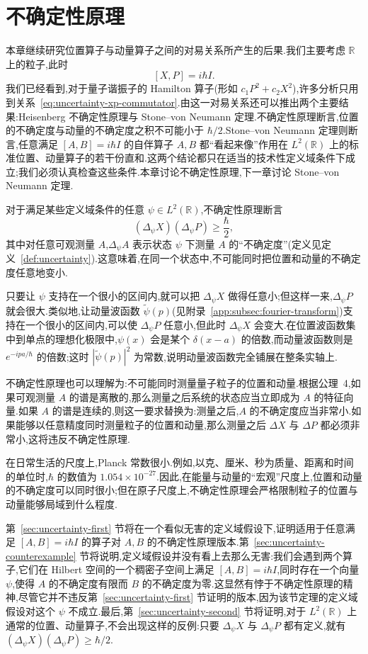 \chapter{不确定性原理}
\label{chap:uncertainty-principle}

本章继续研究位置算子与动量算子之间的对易关系所产生的后果.我们主要考虑 $\mathbb R$ 上的粒子,此时
\[
[X,P]=i\hbar I.
\label{eq:uncertainty-xp-commutator}
\]
我们已经看到,对于量子谐振子的 Hamilton 算子(形如 $c_1P^2+c_2X^2$),许多分析只用到关系~\eqref{eq:uncertainty-xp-commutator}.由这一对易关系还可以推出两个主要结果:Heisenberg 不确定性原理与 Stone--von Neumann 定理.不确定性原理断言,位置的不确定度与动量的不确定度之积不可能小于 $\hbar/2$.Stone--von Neumann 定理则断言,任意满足 $[A,B]=i\hbar I$ 的自伴算子 $A,B$ 都“看起来像”作用在 $L^2(\mathbb R)$ 上的标准位置、动量算子的若干份直和.这两个结论都只在适当的技术性定义域条件下成立;我们必须认真检查这些条件.本章讨论不确定性原理,下一章讨论 Stone--von Neumann 定理.

对于满足某些定义域条件的任意 $\psi\in L^2(\mathbb R)$,不确定性原理断言
\[
(\Delta_\psi X)(\Delta_\psi P)\geq \frac{\hbar}{2},
\]
其中对任意可观测量 $A$,$\Delta_\psi A$ 表示状态 $\psi$ 下测量 $A$ 的“不确定度”(定义见定义~\ref{def:uncertainty}).这意味着,在同一个状态中,不可能同时把位置和动量的不确定度任意地变小.

只要让 $\psi$ 支持在一个很小的区间内,就可以把 $\Delta_\psi X$ 做得任意小;但这样一来,$\Delta_\psi P$ 就会很大.类似地,让动量波函数 $\widetilde\psi(p)$(见附录~\ref{app:subsec:fourier-transform})支持在一个很小的区间内,可以使 $\Delta_\psi P$ 任意小,但此时 $\Delta_\psi X$ 会变大.在位置波函数集中到单点的理想化极限中,$\psi(x)$ 会是某个 $\delta(x-a)$ 的倍数,而动量波函数则是 $e^{-ipa/\hbar}$ 的倍数;这时 $|\widetilde\psi(p)|^2$ 为常数,说明动量波函数完全铺展在整条实轴上.

不确定性原理也可以理解为:不可能同时测量量子粒子的位置和动量.根据公理~4,如果可观测量 $A$ 的谱是离散的,那么测量之后系统的状态应当立即成为 $A$ 的特征向量.如果 $A$ 的谱是连续的,则这一要求替换为:测量之后,$A$ 的不确定度应当非常小.如果能够以任意精度同时测量粒子的位置和动量,那么测量之后 $\Delta X$ 与 $\Delta P$ 都必须非常小,这将违反不确定性原理.

在日常生活的尺度上,Planck 常数很小.例如,以克、厘米、秒为质量、距离和时间的单位时,$\hbar$ 的数值为 $1.054\times10^{-27}$.因此,在能量与动量的“宏观”尺度上,位置和动量的不确定度可以同时很小;但在原子尺度上,不确定性原理会严格限制粒子的位置与动量能够局域到什么程度.

第~\ref{sec:uncertainty-first} 节将在一个看似无害的定义域假设下,证明适用于任意满足 $[A,B]=i\hbar I$ 的算子对 $A,B$ 的不确定性原理版本.第~\ref{sec:uncertainty-counterexample} 节将说明,定义域假设并没有看上去那么无害:我们会遇到两个算子,它们在 Hilbert 空间的一个稠密子空间上满足 $[A,B]=i\hbar I$,同时存在一个向量 $\psi$,使得 $A$ 的不确定度有限而 $B$ 的不确定度为零.这显然有悖于不确定性原理的精神,尽管它并不违反第~\ref{sec:uncertainty-first} 节证明的版本,因为该节定理的定义域假设对这个 $\psi$ 不成立.最后,第~\ref{sec:uncertainty-second} 节将证明,对于 $L^2(\mathbb R)$ 上通常的位置、动量算子,不会出现这样的反例:只要 $\Delta_\psi X$ 与 $\Delta_\psi P$ 都有定义,就有 $(\Delta_\psi X)(\Delta_\psi P)\geq\hbar/2$.

